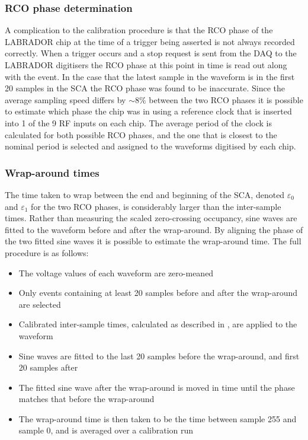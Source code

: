 \subsubsection{RCO phase determination}
\label{sec:calibration:LABRADOR-Digitiser-Chip:RCO-phase-determination}

A complication to the calibration procedure is that the RCO phase of the LABRADOR chip at the time of a trigger being asserted is not always recorded correctly. When a trigger occurs and a stop request is sent from the DAQ to the LABRADOR digitisers the RCO phase at this point in time is read out along with the event. In the case that the latest sample in the waveform is in the first 20 samples in the SCA the RCO phase was found to be inaccurate. Since the average sampling speed differs by $\sim 8 \%$ between the two RCO phases it is possible to estimate which phase the chip was in using a reference clock that is inserted into 1 of the 9 RF inputs on each chip. The average period of the clock is calculated for both possible RCO phases, and the one that is closest to the nominal period is selected and assigned to the waveforms digitised by each chip. 


\subsubsection{Wrap-around times}
\label{sec:calibration:LABRADOR-Digitiser-Chip:Wrap-around-times}

The time taken to wrap between the end and beginning of the SCA, denoted $\varepsilon_{0}$ and $\varepsilon_{1}$ for the two RCO phases, is considerably larger than the inter-sample times. Rather than measuring the scaled zero-crossing occupancy, sine waves are fitted to the waveform before and after the wrap-around. By aligning the phase of the two fitted sine waves it is possible to estimate the wrap-around time. The full procedure is as follows:

\begin{itemize}
\item The voltage values of each waveform are zero-meaned
\item Only events containing at least 20 samples before and after the wrap-around are selected
\item Calibrated inter-sample times, calculated as described in , are applied to the waveform 
\item Sine waves are fitted to the last 20 samples before the wrap-around, and first 20 samples after
\item The fitted sine wave after the wrap-around is moved in time until the phase matches that before the wrap-around
\item The wrap-around time is then taken to be the time between sample 255 and sample 0, and is averaged over a calibration run
\end{itemize}


